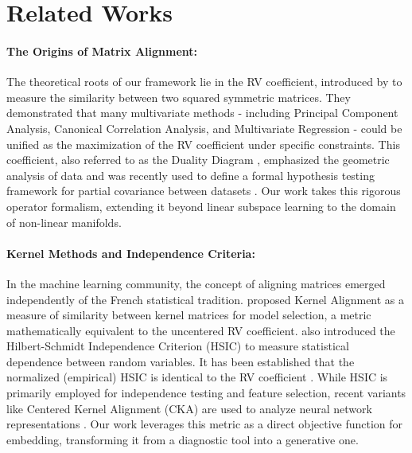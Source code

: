 \documentclass[11pt]{article}
\begin{document}
	
	\section{Related Works}
	\label{section:related_works}
	
	\paragraph{The Origins of Matrix Alignment:} The theoretical roots of our framework lie in the RV coefficient, introduced by \citet{robert_unifying_1976} to measure the similarity between two squared symmetric matrices. They demonstrated that many multivariate methods - including Principal Component Analysis, Canonical Correlation Analysis, and Multivariate Regression - could be unified as the maximization of the RV coefficient under specific constraints. This coefficient, also referred to as the Duality Diagram \citep{holmes_multivariate_2008}, emphasized the geometric analysis of data and was recently used to define a formal hypothesis testing framework for partial covariance between datasets \citep{bavaud_nonparametric_2026}. Our work takes this rigorous operator formalism, extending it beyond linear subspace learning to the domain of non-linear manifolds. 
	
	\paragraph{Kernel Methods and Independence Criteria:} In the machine learning community, the concept of aligning matrices emerged independently of the French statistical tradition. \citet{cristianini_kerneltarget_2001} proposed Kernel Alignment as a measure of similarity between kernel matrices for model selection, a metric mathematically equivalent to the uncentered RV coefficient. \citet{gretton_measuring_2005} also introduced the Hilbert-Schmidt Independence Criterion (HSIC) to measure statistical dependence between random variables. It has been established that the normalized (empirical) HSIC is identical to the RV coefficient \citep{sejdinovic_equivalence_2013}. While HSIC is primarily employed for independence testing and feature selection, recent variants like Centered Kernel Alignment (CKA) are used to analyze neural network representations \citep{kornblith_similarity_2019}. Our work leverages this metric as a direct objective function for embedding, transforming it from a diagnostic tool into a generative one.
	
\end{document}
